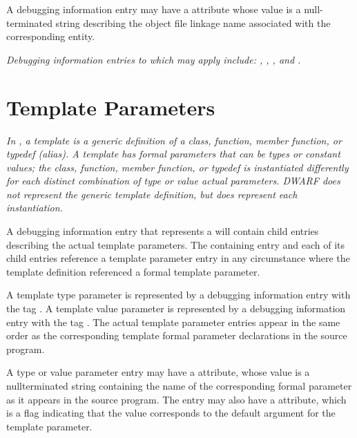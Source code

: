A debugging
information entry may have 
a 
\DWATlinkagename{}
attribute
whose value is a null-terminated string describing the object
file linkage name associated with the corresponding entity.

\textit{Debugging information entries to which \DWATlinkagename{}
may apply include: \DWTAGcommonblock, \DWTAGconstant,
\DWTAGentrypoint, \DWTAGsubprogram{} 
and \DWTAGvariable.
}

\section{Template Parameters}
\label{chap:templateparameters}
\textit{
In , a template is a generic definition of a class, function, member
function, or typedef (alias).  A template has formal parameters that
can be types or constant values; the class, function,
member function, or typedef is instantiated differently for each
distinct combination of type or value actual parameters.  DWARF does
not represent the generic template definition, but does represent each
instantiation.
}

A debugging information entry that represents a 
will contain child entries describing the actual template parameters.
The containing entry and each of its child entries reference a template
parameter entry in any circumstance where the template definition
referenced a formal template parameter.

A template type parameter is represented by a debugging information
entry with the tag
\DWTAGtemplatetypeparameterTARG. 
A template value parameter is represented by a debugging information
entry with the tag
\DWTAGtemplatevalueparameterTARG.
The actual template parameter entries appear in the same order as the 
corresponding template formal parameter declarations in the 
source program.

A type or value parameter entry may have a \DWATname{} attribute, 
whose value is a
null\dash terminated string containing the name of the corresponding 
formal parameter as it appears in the source program.
The entry may also have a 
\DWATdefaultvalue{} attribute, which is a flag indicating 
that the value corresponds to the default argument for the 
template parameter.


